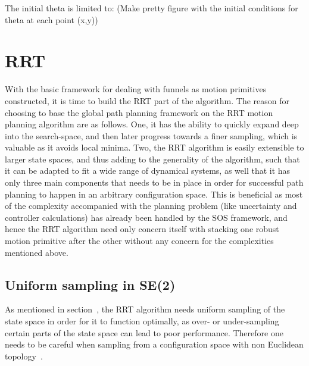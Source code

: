 The initial theta is limited to: (Make pretty figure with the initial conditions
for theta at each point (x,y))

\section{RRT}

With the basic framework for dealing with funnels as motion primitives
constructed, it is time to build the \ac{RRT} part of the \rrtfunnel{}
algorithm. The reason for choosing to base the global path planning framework on
the \ac{RRT} motion planning algorithm are as follows. One, it has the ability
to quickly expand deep into the search-space, and then later progress towards a
finer sampling, which is valuable as it avoids local minima. Two, the \ac{RRT}
algorithm is easily extensible to larger state spaces, and thus adding to the
generality of the \rrtfunnel{} algorithm, such that it can be adapted to fit a
wide range of dynamical systems, as well that it has only three main components
that needs to be in place in order for successful path planning to happen in an
arbitrary configuration space. This is beneficial as most of the complexity
accompanied with the planning problem (like uncertainty and controller
calculations) has already been handled by the \ac{SOS} framework, and hence the
\ac{RRT} algorithm need only concern itself with stacking one robust motion
primitive after the other without any concern for the complexities mentioned
above.

\subsection{Uniform sampling in SE(2)}

As mentioned in section~, the \ac{RRT}
algorithm needs uniform sampling of the state space in order for it to function
optimally, as over- or under-sampling certain parts of the state space can lead
to poor performance. Therefore one needs to be careful when sampling from a
configuration space with non Euclidean
topology~\cite{kuffnerEffectiveSamplingDistance2004}.

